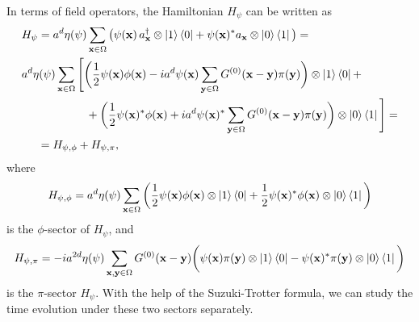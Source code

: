 \documentclass[a4paper,10pt]{report}
\begin{document}
In terms of field operators, the Hamiltonian $H_\psi$ can be written as
\begin{align}
&H_\psi = a^d\eta(\psi)\sum_{\mathbf{x}\in\Omega}\big(\psi(\mathbf{x})\,a^\dag_\mathbf{x}\otimes\ket{1}\bra{0} + \psi(\mathbf{x})^*a_\mathbf{x}\otimes\ket{0}\bra{1}\big) = \nonumber\\
&a^d\eta(\psi)\sum_{\mathbf{x}\in\Omega}\Bigg[\bigg(\frac{1}{2}\psi(\mathbf{x})\phi(\mathbf{x}) - ia^d\psi(\mathbf{x})\sum_{\mathbf{y}\in\Omega}G^{(0)}(\mathbf{x}-\mathbf{y})\pi(\mathbf{y})\bigg)\otimes\ket{1}\bra{0} + \nonumber\\
&\hspace{2cm}+\bigg(\frac{1}{2}\psi(\mathbf{x})^*\phi(\mathbf{x}) + ia^d \psi(\mathbf{x})^*\sum_{\mathbf{y}\in\Omega}G^{(0)}(\mathbf{x}-\mathbf{y})\pi(\mathbf{y})\bigg)\otimes\ket{0}\bra{1}\Bigg] = \nonumber\\
&\hspace{.5cm}= H_{\psi,\phi} + H_{\psi,\pi},
\end{align}
where
\begin{equation}
H_{\psi,\phi} = a^d\eta(\psi)\sum_{\mathbf{x}\in\Omega}\bigg(\frac{1}{2}\psi(\mathbf{x})\phi(\mathbf{x})\otimes\ket{1}\bra{0} + \frac{1}{2}\psi(\mathbf{x})^*\phi(\mathbf{x})\otimes\ket{0}\bra{1}\bigg)
\end{equation}
is the $\phi$-sector of $H_\psi$, and
\begin{equation}
H_{\psi,\pi} = -ia^{2d}\eta(\psi)\sum_{\mathbf{x},\mathbf{y}\in\Omega}G^{(0)}(\mathbf{x}-\mathbf{y})\bigg(\psi(\mathbf{x})\pi(\mathbf{y})\otimes\ket{1}\bra{0} - \psi(\mathbf{x})^*\pi(\mathbf{y})\otimes\ket{0}\bra{1}\bigg)
\end{equation}
is the $\pi$-sector $H_\psi$. With the help of the Suzuki-Trotter formula, we can study the time evolution under these two sectors separately. 
\end{document}
